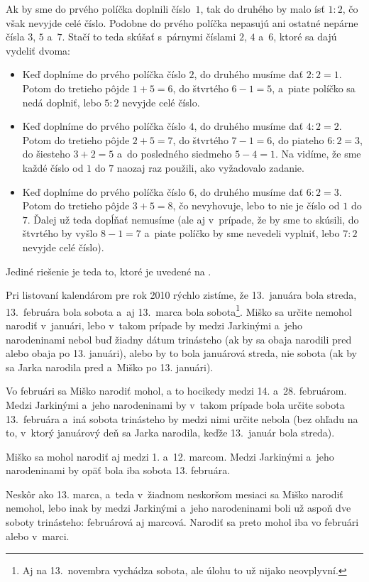 ﻿{%
Ak by sme do prvého políčka doplnili číslo~$1$, tak do druhého by malo ísť ${1:2}$, čo však nevyjde celé číslo. Podobne do prvého políčka nepasujú ani ostatné nepárne čísla $3$, $5$ a~$7$. Stačí to teda skúšať s~párnymi číslami $2$, $4$ a~$6$, ktoré sa dajú vydeliť dvoma:
\begin{itemize}
  \item Keď doplníme do prvého políčka číslo $2$, do druhého musíme dať $2:2=1$. Potom do tretieho pôjde $1+5=6$, do štvrtého $6-1=5$, a~piate políčko sa nedá doplniť, lebo $5:2$ nevyjde celé číslo.
  \item Keď doplníme do prvého políčka číslo $4$, do druhého musíme dať $4:2=2$. Potom do tretieho pôjde $2+5=7$, do štvrtého $7-1=6$, do piateho $6:2=3$, do šiesteho $3+2=5$ a~do posledného siedmeho $5-4=1$. Na \obr{} vidíme, že sme každé číslo od $1$ do $7$ naozaj raz použili, ako vyžadovalo zadanie.
  \item Keď doplníme do prvého políčka číslo $6$, do druhého musíme dať $6:2=3$. Potom do tretieho pôjde $3+5=8$, čo nevyhovuje, lebo to nie je číslo od $1$ do $7$. Ďalej už teda dopĺňať nemusíme (ale aj v~prípade, že by sme to skúsili, do štvrtého by vyšlo $8-1=7$ a~piate políčko by sme nevedeli vyplniť, lebo $7:2$ nevyjde celé číslo).
\end{itemize}
\noindent
Jediné riešenie je teda to, ktoré je uvedené na .
}

{%
Pri listovaní kalendárom pre rok 2010 rýchlo zistíme, že 13.~januára bola streda, 13.~februára bola sobota a~aj 13.~marca bola sobota\footnote{Aj na 13.~novembra vychádza sobota, ale úlohu to už nijako neovplyvní.}. Miško sa určite nemohol narodiť v~januári, lebo v~takom prípade by medzi Jarkinými a~jeho narodeninami nebol buď žiadny dátum trinásteho (ak by sa obaja narodili pred alebo obaja po 13. januári), alebo by to bola januárová streda, nie sobota (ak by sa Jarka narodila pred a~Miško po 13. januári).

Vo februári sa Miško narodiť mohol, a to hocikedy medzi 14. a~28. februárom. Medzi Jarkinými a~jeho narodeninami by v~takom prípade bola určite sobota 13.~februára a~iná sobota trinásteho by medzi nimi určite nebola (bez ohľadu na to, v~ktorý januárový deň sa Jarka narodila, keďže 13.~január bola streda).

Miško sa mohol narodiť aj medzi 1. a~12. marcom. Medzi Jarkinými a~jeho narodeninami by opäť bola iba sobota 13. februára.

Neskôr ako 13. marca, a~teda v~žiadnom neskoršom mesiaci sa Miško narodiť nemohol, lebo inak by medzi Jarkinými a~jeho narodeninami boli už aspoň dve soboty trinásteho: februárová aj marcová. Narodiť sa preto mohol iba vo februári alebo v~marci.
}

